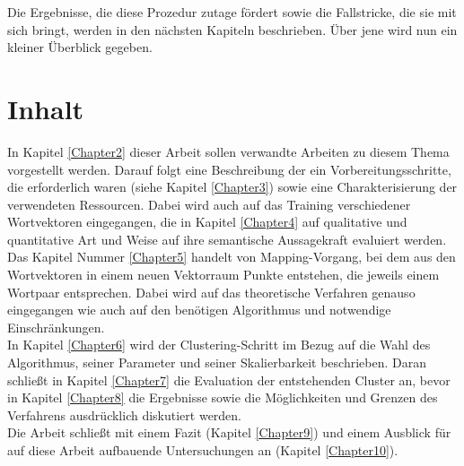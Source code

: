 Die Ergebnisse, die diese Prozedur zutage fördert sowie die Fallstricke, die sie mit sich bringt, werden in den nächsten
Kapiteln beschrieben. Über jene wird nun ein kleiner Überblick gegeben.

\section{Inhalt}

In Kapitel \ref{Chapter2} dieser Arbeit sollen verwandte Arbeiten zu diesem Thema vorgestellt werden. Darauf folgt eine Beschreibung
der ein Vorbereitungsschritte, die erforderlich waren (siehe Kapitel \ref{Chapter3}) sowie eine Charakterisierung der verwendeten Ressourcen.
Dabei wird auch auf das Training verschiedener Wortvektoren eingegangen, die in Kapitel \ref{Chapter4} auf qualitative und quantitative
Art und Weise auf ihre semantische Aussagekraft evaluiert werden. \\
Das Kapitel Nummer \ref{Chapter5} handelt von Mapping-Vorgang, bei dem aus den Wortvektoren in einem neuen Vektorraum Punkte
entstehen, die jeweils einem Wortpaar entsprechen. Dabei wird auf das theoretische Verfahren genauso eingegangen wie auch
auf den benötigen Algorithmus und notwendige Einschränkungen. \\
In Kapitel \ref{Chapter6} wird der Clustering-Schritt im Bezug auf die Wahl des Algorithmus, seiner Parameter und
seiner Skalierbarkeit beschrieben. Daran schließt in Kapitel \ref{Chapter7} die Evaluation der entstehenden Cluster an,
bevor in Kapitel \ref{Chapter8} die Ergebnisse sowie die Möglichkeiten und Grenzen des Verfahrens ausdrücklich diskutiert werden. \\
Die Arbeit schließt mit einem Fazit (Kapitel \ref{Chapter9}) und einem Ausblick für auf diese Arbeit aufbauende Untersuchungen
an (Kapitel \ref{Chapter10}).
